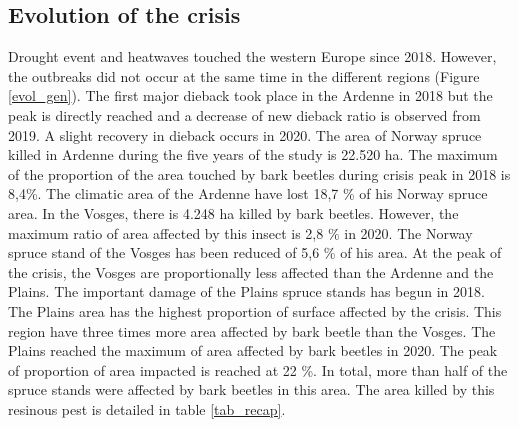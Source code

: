 \documentclass[3p,procedia]{elsarticle}
\begin{document}
\subsection{Evolution of the crisis }

Drought event and heatwaves  touched the western Europe since 2018.
However, the outbreaks did not occur at the same time in the different regions (Figure \ref{evol_gen}).
The first major dieback took place in the Ardenne in 2018 but the peak is directly reached and a decrease of new dieback ratio is observed from 2019. 
A slight recovery in dieback occurs in 2020.
The area of Norway spruce killed in Ardenne during the five years of the study is 22.520 ha.
The maximum of the proportion of the area touched by bark beetles during crisis peak in 2018 is 8,4\%. 
The climatic area of the Ardenne have lost 18,7 \% of his Norway spruce area.
In the Vosges, there is 4.248 ha killed by bark beetles.
However, the maximum ratio of area affected by this insect is 2,8 \% in 2020.
The Norway spruce stand of the Vosges has been reduced of 5,6 \% of his area. 
At the peak of the crisis, the Vosges are proportionally less affected than the Ardenne and the Plains.
The important damage of the Plains spruce stands has begun in 2018.  
The Plains area has the highest proportion of surface affected by the crisis.
This region have three times more area affected by bark beetle than the Vosges.
The Plains reached the maximum of area affected by bark beetles in 2020. 
The peak of proportion of area impacted is reached at 22 \%.
In total, more than half of the spruce stands were affected by bark beetles in this area.
The area killed by this resinous pest is detailed in table \ref{tab_recap}.
\end{document}
